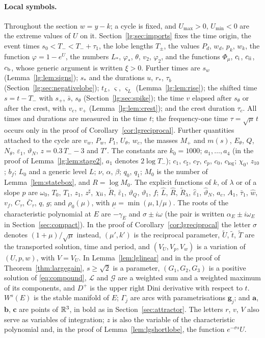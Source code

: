 \paragraph{Local symbols.}
Throughout the section $w=y-k$; a cycle is fixed, and $U_{\max}>0$, $U_{\min}<0$ are the extreme values of $U$ on it. Section~\ref{lg:sec:imports} fixes the time origin, the event times $s_0<T_-<T_-+\tau_1$, the lobe lengths $T_\pm$, the values $P_d$, $w_d$, $p_k$, $w_k$, the function $\varphi=1-e^{U}$, the numbers $L_\ast$, $\varphi_\ast$, $\theta$, $v_2$, $\varphi_2$, and the functions $\Phi_\mu$, $c_{\rm i}$, $c_{\rm ii}$, $c_{\rm b}$, whose generic argument is written $\xi>0$. Further times are $s_w$ (Lemma~\ref{lg:lem:signs}); $s_\ast$ and the durations $u$, $r_\ast$, $\tau_b$ (Section~\ref{lg:sec:negativelobe}); $t_L$, $\varsigma$, $\varsigma_L$ (Lemma~\ref{lg:lem:rise}); the shifted time $s=t-T_-$ with $s_+$, $\bar s$, $s_\theta$ (Section~\ref{lg:sec:spike}); the time $v$ elapsed after $s_\theta$ or after the crest, with $v_c$, $v_+$ (Lemma~\ref{lg:lem:crest}); and the crest duration $\tau_c$. All times and durations are measured in the time $t$; the frequency-one time $\tau=\sqrt\mu\,t$ occurs only in the proof of Corollary~\ref{cor:lgreciprocal}.
Further quantities attached to the cycle are $v_w$, $P_w$, $P_1$, $U_\theta$, $w_c$, the masses $M_+$ and $m(s)$, $E_\theta$, $Q$, $N_\theta$, $\varepsilon_1$, $\vartheta_N$, $z=0.3\,T_--3$ and $T'$.
The constants are $k_0=1000$; $a_1,\dots,a_4$ (in the proof of Lemma~\ref{lg:lem:stage2}, $a_1$ denotes $2\log T_-$); $c_1$, $c_\sharp$, $c_T$, $c_p$, $c_0$, $c_{\log}$; $\chi_0$, $z_{10}$; $b_f$; $L_0$ and a generic level $L$; $\nu$, $\alpha$, $\beta$; $q_0$, $q_1$; $M_0$ is the number of Lemma~\ref{lem:statebox}, and $R=\log M_0$.
The explicit functions of $k$, of $\lambda$ or of a slope $p$ are $\omega_0$, $T_0$, $T_1$, $z_1$, $z^\sharp$, $\chi_{\rm ii}$, $\tilde R$, $\bar\varepsilon_1$, $\vartheta_Q$, $\vartheta_1$, $f$; $\hat L$, $\hat R$, $\tilde R_\lambda$, $\hat\varepsilon_1$, $\hat\vartheta_N$, $a_c$, $A_1$, $\bar\tau_1$, $\hat w$, $v_f$, $C_\tau$, $\bar C_\tau$, $q$, $g$; and $\rho_0(\mu)$, with $\underline\mu=\min(\mu,1/\mu)$.
The roots of the characteristic polynomial at $E$ are $-\gamma_E$ and $\sigma\pm i\omega$ (the pair is written $\alpha_E\pm i\omega_E$ in Section~\ref{sec:compact}). In the proof of Corollary~\ref{cor:lgreciprocal} the letter $\sigma$ denotes $(1+\mu)/\sqrt\mu$ instead, $(\mu',k')$ is the reciprocal parameter, $\tilde U$, $\tilde t$, $\tilde T$ are the transported solution, time and period, and $(V_U,V_p,V_w)$ is a variation of $(U,p,w)$, with $V=V_U$. In Lemma~\ref{lem:lglinear} and in the proof of Theorem~\ref{thm:largegain}, $s\ge\sqrt2$ is a parameter, $(G_1,G_2,G_3)$ is a positive solution of \eqref{eq:compound}, $\mathcal L$ and $\mathcal G$ are a weighted sum and a weighted maximum of its components, and $D^+$ is the upper right Dini derivative with respect to $t$. $W^s(E)$ is the stable manifold of $E$; $\Gamma_j$ are arcs with parametrisations $\mathbf g_j$; and $\mathbf a$, $\mathbf b$, $\mathbf c$ are points of $\mathbb R^3$, in bold as in Section~\ref{sec:attractor}. The letters $r$, $v$, $V$ also serve as variables of integration; $z$ is also the variable of the characteristic polynomial and, in the proof of Lemma~\ref{lem:lgshortlobe}, the function $e^{-\sigma s}U$.
